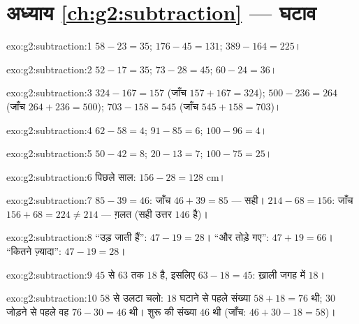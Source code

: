 \section*{अध्याय \ref{ch:g2:subtraction} --- घटाव}

\begin{solution}{exo:g2:subtraction:1}
$58 - 23 = 35$; \quad $176 - 45 = 131$; \quad $389 - 164 = 225$।
\end{solution}

\begin{solution}{exo:g2:subtraction:2}
$52 - 17 = 35$; \quad $73 - 28 = 45$; \quad $60 - 24 = 36$।
\end{solution}

\begin{solution}{exo:g2:subtraction:3}
$324 - 167 = 157$ (जाँच $157 + 167 = 324$); \quad
$500 - 236 = 264$ (जाँच $264 + 236 = 500$); \quad
$703 - 158 = 545$ (जाँच $545 + 158 = 703$)।
\end{solution}

\begin{solution}{exo:g2:subtraction:4}
$62 - 58 = 4$; \quad $91 - 85 = 6$; \quad $100 - 96 = 4$।
\end{solution}

\begin{solution}{exo:g2:subtraction:5}
$50 - 42 = 8$; \quad $20 - 13 = 7$; \quad $100 - 75 = 25$।
\end{solution}

\begin{solution}{exo:g2:subtraction:6}
पिछले साल: $156 - 28 = 128$ cm।
\end{solution}

\begin{solution}{exo:g2:subtraction:7}
$85 - 39 = 46$: जाँच $46 + 39 = 85$ --- सही।
$214 - 68 = 156$: जाँच $156 + 68 = 224 \neq 214$ --- ग़लत (सही
उत्तर $146$ है)।
\end{solution}

\begin{solution}{exo:g2:subtraction:8}
``उड़ जाती हैं'': $47 - 19 = 28$। ``और तोड़े गए'': $47 + 19 = 66$।
``कितने ज़्यादा'': $47 - 19 = 28$।
\end{solution}

\begin{solution}{exo:g2:subtraction:9}
$45$ से $63$ तक $18$ है, इसलिए $63 - 18 = 45$: ख़ाली जगह में $18$।
\end{solution}

\begin{solution}{exo:g2:subtraction:10}
$58$ से उलटा चलो: $18$ घटाने से पहले संख्या
$58 + 18 = 76$ थी; $30$ जोड़ने से पहले वह $76 - 30 = 46$ थी।
शुरू की संख्या $46$ थी (जाँच: $46 + 30 - 18 = 58$)।
\end{solution}
